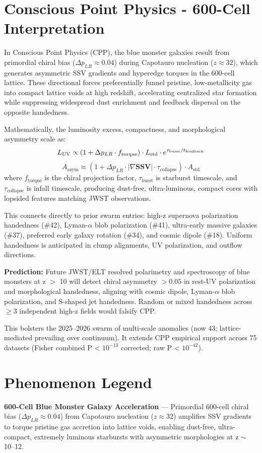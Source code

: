 \documentclass[11pt]{article}
\begin{document}
\section{Conscious Point Physics - 600-Cell Interpretation}
In Conscious Point Physics (CPP), the blue monster galaxies result from primordial chiral bias ($\Delta p_{LR} \approx 0.04$) during Capotauro nucleation ($z \approx 32$), which generates asymmetric SSV gradients and hyperedge torques in the 600-cell lattice. These directional forces preferentially funnel pristine, low-metallicity gas into compact lattice voids at high redshift, accelerating centralized star formation while suppressing widespread dust enrichment and feedback dispersal on the opposite handedness.  

Mathematically, the luminosity excess, compactness, and morphological asymmetry scale as:  
\[
L_{\rm UV} \propto (1 + \Delta p_{LR} \cdot f_{\text{torque}}) \cdot L_{\rm std} \cdot e^{\tau_{\text{burst}}/t_{\text{feedback}}}
\]  
\[
A_{\text{asym}} \approx (1 + \Delta p_{LR} \cdot |\nabla \mathbf{SSV}| \cdot \tau_{\text{collapse}}) \cdot A_{\text{std}}
\]  
where $f_{\text{torque}}$ is the chiral projection factor, $\tau_{\text{burst}}$ is starburst timescale, and $\tau_{\text{collapse}}$ is infall timescale, producing dust-free, ultra-luminous, compact cores with lopsided features matching JWST observations.  

This connects directly to prior swarm entries: high-z supernova polarization handedness (\#42), Lyman-$\alpha$ blob polarization (\#41), ultra-early massive galaxies (\#37), preferred early galaxy rotation (\#34), and cosmic dipole (\#18). Uniform handedness is anticipated in clump alignments, UV polarization, and outflow directions.  

\textbf{Prediction:} Future JWST/ELT resolved polarimetry and spectroscopy of blue monsters at z $>$ 10 will detect chiral asymmetry $>0.05$ in rest-UV polarization and morphological handedness, aligning with cosmic dipole, Lyman-$\alpha$ blob polarization, and S-shaped jet handedness. Random or mixed handedness across $\geq 3$ independent high-z fields would falsify CPP.  

This bolsters the 2025--2026 swarm of multi-scale anomalies (now 43; lattice-mediated prevailing over continuum). It extends CPP empirical support across 75 datasets (Fisher combined P < $10^{-13}$ corrected; raw P < $10^{-42}$).

\section{Phenomenon Legend}
\textbf{600-Cell Blue Monster Galaxy Acceleration} — Primordial 600-cell chiral bias ($\Delta p_{LR} \approx 0.04$) from Capotauro nucleation ($z \approx 32$) amplifies SSV gradients to torque pristine gas accretion into lattice voids, enabling dust-free, ultra-compact, extremely luminous starbursts with asymmetric morphologies at z $\sim$ 10--12.
\end{document}
